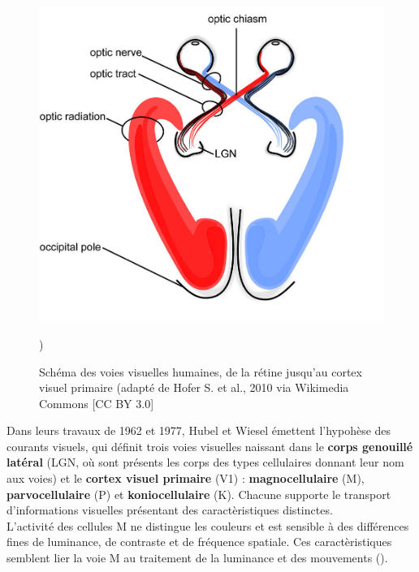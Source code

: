 \begin{figure}[th]
\centering
\includegraphics{Figures/visual_system}
\decoRule %
\caption[Figure]{Schéma des voies visuelles humaines, de la rétine jusqu'au cortex visuel primaire (adapté de Hofer S. et al., 2010 via Wikimedia Commons [CC BY 3.0]})
\label{fig:visual_system}
\end{figure}

Dans leurs travaux de 1962 et 1977, Hubel et Wiesel émettent l'hypohèse des courants visuels, qui définit trois voies visuelles naissant dans le \textbf{corps genouillé latéral} (LGN, où sont présents les corps des types cellulaires donnant leur nom aux voies) et le \textbf{cortex visuel primaire} (V1) :  \textbf{magnocellulaire} (M),  \textbf{parvocellulaire} (P) et  \textbf{koniocellulaire} (K). Chacune supporte le transport d'informations visuelles présentant des caractèristiques distinctes.\\
L'activité des cellules M ne distingue les couleurs et est sensible à des différences fines de luminance, de contraste et de fréquence spatiale. Ces caractèristiques semblent lier la voie M au traitement de la luminance et des mouvements (\cite{Werner2014}).

